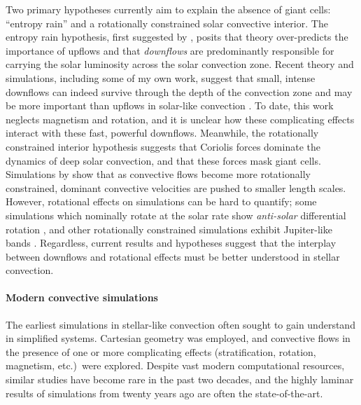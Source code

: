 \documentclass[11pt, preprint]{aastex}
\begin{document}
Two primary hypotheses currently aim to explain the absence of giant cells: ``entropy rain'' and a rotationally constrained solar convective interior.
The entropy rain hypothesis, first suggested by \citet{spruit1997}, posits that theory over-predicts the importance of upflows and that \emph{downflows} are predominantly responsible for carrying the solar luminosity across the solar convection zone.
Recent theory and simulations, including some of my own work, suggest that small, intense downflows can indeed survive through the depth of the convection zone and may be more important than upflows in solar-like convection \citep{brandenburg2016, kapyla&all2017, andersLB2019}.
To date, this work neglects magnetism and rotation, and it is unclear how these complicating effects interact with these fast, powerful downflows.
Meanwhile, the rotationally constrained interior hypothesis suggests that Coriolis forces dominate the dynamics of deep solar convection, and that these forces mask giant cells.
Simulations by \citet{featherstone&hindman2016} show that as convective flows become more rotationally constrained, dominant convective velocities are pushed to smaller length scales.
However, rotational effects on simulations can be hard to quantify; some simulations which nominally rotate at the solar rate show \emph{anti-solar} differential rotation \citep{gastine&all2014}, and other rotationally constrained simulations exhibit Jupiter-like bands \citep{brun&all2017}.
Regardless, current results and hypotheses suggest that the interplay between downflows and rotational effects must be better understood in stellar convection.

\vspace{-0.5cm}
\paragraph{Modern convective simulations}
\label{sct:modern_simulations}
The earliest simulations in stellar-like convection \citep{graham1975, hurlburt&all1984, cattaneo&all1991, brummell&all1996, brummell&all1998} often sought to gain understand in simplified systems.
Cartesian geometry was employed, and convective flows in the presence of one or more complicating effects (stratification, rotation, magnetism, etc.)~were explored.
Despite vast modern computational resources, similar studies \citep[e.g.,][]{wood&brummell2012, anders&brown2017, wood&brummell2018} have become rare in the past two decades, and the highly laminar results of simulations from twenty years ago are often the state-of-the-art.
\end{document}
